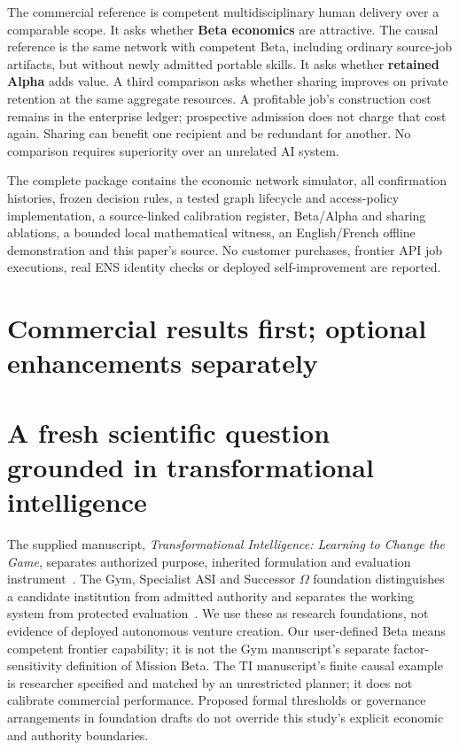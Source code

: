 \documentclass[11pt,letterpaper]{article}
\begin{document}
The commercial reference is competent multidisciplinary human delivery over a comparable scope. It asks whether \textbf{Beta economics} are attractive. The causal reference is the same network with competent Beta, including ordinary source-job artifacts, but without newly admitted portable skills. It asks whether \textbf{retained Alpha} adds value. A third comparison asks whether sharing improves on private retention at the same aggregate resources. A profitable job's construction cost remains in the enterprise ledger; prospective admission does not charge that cost again. Sharing can benefit one recipient and be redundant for another. No comparison requires superiority over an unrelated AI system.

The complete package contains the economic network simulator, all confirmation histories, frozen decision rules, a tested graph lifecycle and access-policy implementation, a source-linked calibration register, Beta/Alpha and sharing ablations, a bounded local mathematical witness, an English/French offline demonstration and this paper's source. No customer purchases, frontier API job executions, real ENS identity checks or deployed self-improvement are reported.

\section{Commercial results first; optional enhancements separately}






\section{A fresh scientific question grounded in transformational intelligence}
The supplied manuscript, \emph{Transformational Intelligence: Learning to Change the Game}, separates authorized purpose, inherited formulation and evaluation instrument~\cite{TI}. The Gym, Specialist ASI and Successor $\Omega$ foundation distinguishes a candidate institution from admitted authority and separates the working system from protected evaluation~\cite{GymOmega,EnterpriseOmega}. We use these as research foundations, not evidence of deployed autonomous venture creation. Our user-defined Beta means competent frontier capability; it is not the Gym manuscript's separate factor-sensitivity definition of Mission Beta. The TI manuscript's finite causal example is researcher specified and matched by an unrestricted planner; it does not calibrate commercial performance. Proposed formal thresholds or governance arrangements in foundation drafts do not override this study's explicit economic and authority boundaries.
\end{document}
